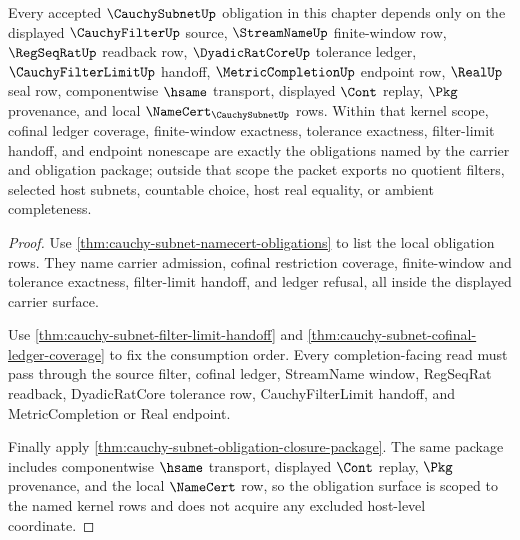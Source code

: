 \begin{theorem}
\label{thm:cauchy-subnet-scoped-kernel-route}
Every accepted $\CauchySubnetUp$ obligation in this chapter depends only on the displayed $\CauchyFilterUp$ source, $\StreamNameUp$ finite-window row, $\RegSeqRatUp$ readback row, $\DyadicRatCoreUp$ tolerance ledger, $\CauchyFilterLimitUp$ handoff, $\MetricCompletionUp$ endpoint row, $\RealUp$ seal row, componentwise $\hsame$ transport, displayed $\Cont$ replay, $\Pkg$ provenance, and local $\NameCert_{\CauchySubnetUp}$ rows. Within that kernel scope, cofinal ledger coverage, finite-window exactness, tolerance exactness, filter-limit handoff, and endpoint nonescape are exactly the obligations named by the carrier and obligation package; outside that scope the packet exports no quotient filters, selected host subnets, countable choice, host real equality, or ambient completeness.
\end{theorem}
\begin{proof}
Use \autoref{thm:cauchy-subnet-namecert-obligations} to list the local obligation rows. They name carrier admission, cofinal restriction coverage, finite-window and tolerance exactness, filter-limit handoff, and ledger refusal, all inside the displayed carrier surface.

Use \autoref{thm:cauchy-subnet-filter-limit-handoff} and \autoref{thm:cauchy-subnet-cofinal-ledger-coverage} to fix the consumption order. Every completion-facing read must pass through the source filter, cofinal ledger, StreamName window, RegSeqRat readback, DyadicRatCore tolerance row, CauchyFilterLimit handoff, and MetricCompletion or Real endpoint.

Finally apply \autoref{thm:cauchy-subnet-obligation-closure-package}. The same package includes componentwise $\hsame$ transport, displayed $\Cont$ replay, $\Pkg$ provenance, and the local $\NameCert$ row, so the obligation surface is scoped to the named kernel rows and does not acquire any excluded host-level coordinate.
\end{proof}

